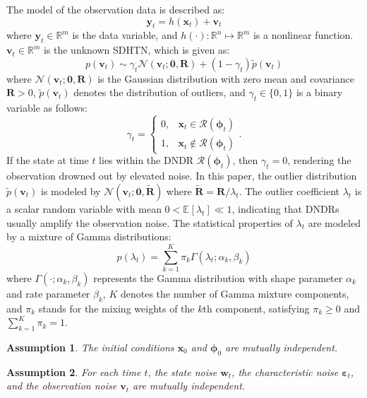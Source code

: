 \documentclass[10pt,twocolumn,twoside]{IEEEtran}
\newtheorem{assumption}{Assumption}
\newcommand{\E}[2][]{ \mathbb{E}_{#1}\left[#2\right] } %
\newcommand{\fs}{\text{.}} %
\newcommand{\x}{{ \bm{x} }}
\newcommand{\y}{{ \bm{y} }}
\begin{document}
The model of the observation data is described as:
\begin{equation} \label{eq:OM} %
\y_t = h(\x_t) + \bm{v}_t
\end{equation}
where $\y_t\in\mathbb{R}^m$ is the data variable, and $h(\cdot):\mathbb{R}^n\mapsto\mathbb{R}^m$ is a nonlinear function. $\bm{v}_t\in\mathbb{R}^m$ is the unknown SDHTN, which is given as:
$$
p(\bm{v}_t) \sim \gamma_t\mathcal{N}(\bm{v}_t;\bm{0},\bm{R}) + (1-\gamma_t)\tilde{p}(\bm{v}_t)
$$
where $\mathcal{N}(\bm{v}_t;\bm{0},\bm{R})$ is the Gaussian distribution with zero mean and covariance $\bm{R}>0$, $\tilde{p}(\bm{v}_t)$ denotes the distribution of outliers, and $\gamma_t\in\{0,1\}$ is a binary variable as follows: 
\begin{equation} \label{eq:gamma}
\gamma_t = \begin{cases}
0, & \x_t \in \mathcal{R}(\bm\phi_t) \\
1, & \x_t \notin \mathcal{R}(\bm\phi_t)
\end{cases} \fs
\end{equation}
If the state at time $t$ lies within the DNDR $\mathcal{R}(\bm\phi_t)$, then $\gamma_t=0$, rendering the observation drowned out by elevated noise. In this paper, the outlier distribution $\tilde{p}(\bm{v}_t)$ is modeled by $\mathcal{N}(\bm{v}_t;\bm{0},\tilde{\bm{R}})$ where $\tilde{\bm{R}}=\bm{R}/\lambda_t$. The outlier coefficient $\lambda_t$ is a scalar random variable with mean $0<\E{\lambda_t}\ll1$, indicating that DNDRs usually amplify the observation noise. The statistical properties of $\lambda_t$ are modeled by a mixture of Gamma distributions:
\begin{equation} \label{eq:outlier-coe-pdf}
    p(\lambda_t) = \sum_{k=1}^K\pi_k\Gamma(\lambda_t;\alpha_k,\beta_k)
\end{equation}
where $\Gamma(\cdot;\alpha_k,\beta_k)$ represents the Gamma distribution with shape parameter $\alpha_k$ and rate parameter $\beta_k$, $K$ denotes the number of Gamma mixture components, and $\pi_k$ stands for the mixing weights of the $k$th component, satisfying $\pi_k\geq0$ and $\sum_{k=1}^K\pi_k=1$.

\begin{assumption} \label{A1}
The initial conditions $\x_0$ and $\bm\phi_0$ are mutually independent.
\end{assumption}

\begin{assumption} \label{A2}
For each time $t$, the state noise $\bm{w}_t$, the characteristic noise $\bm{\varepsilon}_t$, and the observation noise $\bm{v}_t$ are mutually independent.
\end{assumption}
\end{document}
